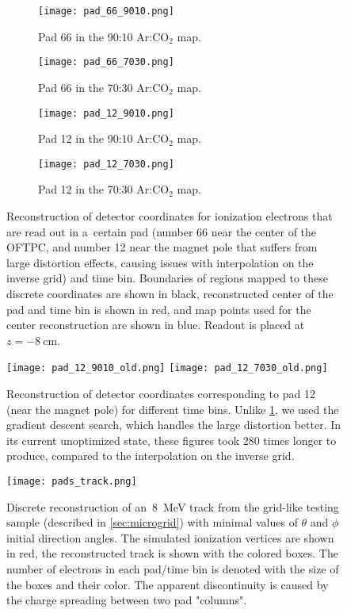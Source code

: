 		\begin{figure}
			\centering
			\begin{subfigure}[t]{0.48\textwidth}
				\centering
				\texttt{[image: pad\_66\_9010.png]}
				\caption{Pad 66 in the 90:10 Ar:CO$_2$ map.}
			\end{subfigure}
			\hfill
			\begin{subfigure}[t]{0.48\textwidth}
				\centering
				\texttt{[image: pad\_66\_7030.png]}
				\caption{Pad 66 in the 70:30 Ar:CO$_2$ map.}
			\end{subfigure}
			\begin{subfigure}[t]{0.48\textwidth}
				\centering
				\texttt{[image: pad\_12\_9010.png]}
				\caption{Pad 12 in the 90:10 Ar:CO$_2$ map.}
			\end{subfigure}
			\hfill
			\begin{subfigure}[t]{0.48\textwidth}
				\centering
				\texttt{[image: pad\_12\_7030.png]}
				\caption{Pad 12 in the 70:30 Ar:CO$_2$ map.}
			\end{subfigure}
			\caption{Reconstruction of detector coordinates for ionization electrons that are read out in a~certain pad (number 66 near the center of the \ac{OFTPC}, and number 12 near the magnet pole that suffers from large distortion effects, causing issues with interpolation on the inverse grid) and time bin. Boundaries of regions mapped to these discrete coordinates are shown in black, reconstructed center of the pad and time bin is shown in red, and map points used for the center reconstruction are shown in blue. Readout is placed at $z = \qty{-8}{\cm}$.}
			\label{fig:pad_reco}	
		\end{figure}
		
		\begin{figure}
			\centering
			\texttt{[image: pad\_12\_9010\_old.png]}
			\hfill
			\texttt{[image: pad\_12\_7030\_old.png]}
			\caption{Reconstruction of detector coordinates corresponding to pad 12 (near the magnet pole) for different time bins. Unlike \cref{fig:pad_reco}, we used the gradient descent search, which handles the large distortion better. In its current unoptimized state, these figures took 280 times longer to produce, compared to the interpolation on the inverse grid.}
			\label{fig:pad_reco_old}
		\end{figure}
		
		\begin{figure}
			\centering
			\texttt{[image: pads\_track.png]}
			\caption{Discrete reconstruction of an~\qty{8}{\MeV} track from the grid-like testing sample (described in \cref{sec:microgrid}) with minimal values of $\theta$ and $\phi$ initial direction angles. The simulated ionization vertices are shown in red, the reconstructed track is shown with the colored boxes. The number of electrons in each pad/time bin is denoted with the size of the boxes and their color. The apparent discontinuity is caused by the charge spreading between two pad "columns".}
			\label{fig:pad_track}
		\end{figure}